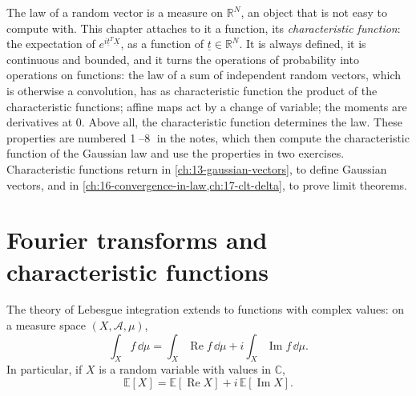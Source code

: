 
The law of a random vector is a measure on $\mathbb R^N$, an object that is not easy to
compute with. This chapter attaches to it a function, its \emph{characteristic function}: the
expectation of $e^{i\underline t^T\underline X}$, as a function of $\underline t\in\mathbb R^N$.
It is always defined, it is continuous and bounded, and it turns the operations of probability
into operations on functions: the law of a sum of independent random vectors, which is
otherwise a convolution, has as characteristic function the product of the characteristic
functions; affine maps act by a change of variable; the moments are derivatives at $0$.
Above all, the characteristic function determines the law. These properties are numbered
\textcircled{\scriptsize 1}--\textcircled{\scriptsize 8} in the notes, which then compute
the characteristic function of the Gaussian law and use the properties in two exercises.
Characteristic functions return in \cref{ch:13-gaussian-vectors}, to define Gaussian vectors,
and in \cref{ch:16-convergence-in-law,ch:17-clt-delta}, to prove limit theorems.

\section{Fourier transforms and characteristic functions}\label{sec:cf-definitions}

\begin{remark}\label{rem:cf-complex}
The theory of Lebesgue integration extends to functions with complex values: on a measure
space $(X,\mathcal A,\mu)$,
\[
  \int_Xf\,\dd\mu=\int_X\operatorname{Re}f\,\dd\mu+i\int_X\operatorname{Im}f\,\dd\mu .
\]
In particular, if $X$ is a random variable with values in $\mathbb C$,
\[
  \mathbb E[X]=\mathbb E[\operatorname{Re}X]+i\,\mathbb E[\operatorname{Im}X].
\]
\end{remark}


